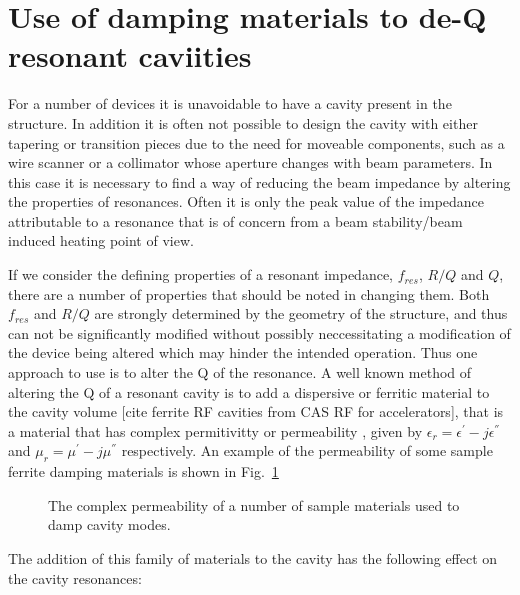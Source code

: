 \section{Use of damping materials to de-Q resonant caviities}
\label{sec:damping_materials}

For a number of devices it is unavoidable to have a cavity present in the structure. In addition it is often not possible to design the cavity with either tapering or transition pieces due to the need for moveable components, such as a wire scanner or a collimator whose aperture changes with beam parameters. In this case it is necessary to find a way of reducing the beam impedance by altering the properties of resonances. Often it is only the peak value of the impedance attributable to a resonance that is of concern from a beam stability/beam induced heating point of view. 

If we consider the defining properties of a resonant impedance, $f_{res}$, $R/Q$ and $Q$, there are a number of properties that should be noted in changing them. Both $f_{res}$ and $R/Q$ are strongly determined by the geometry of the structure, and thus can not be significantly modified without possibly neccessitating a modification of the device being altered which may hinder the intended operation. Thus one approach to use is to alter the Q of the resonance. A well known method of altering the Q of a resonant cavity is to add a dispersive or ferritic material to the cavity volume [cite ferrite RF cavities from CAS RF for accelerators], that is a material that has complex permitivitty or permeability , given by $\epsilon_{r} = \epsilon^{'} - j \epsilon^{''}$ and $\mu_{r} = \mu^{'} - j \mu^{''}$ respectively. An example of the permeability of some sample ferrite damping materials is shown in Fig.~\ref{fig:ferr_mu_damp}

\begin{figure}

\label{fig:ferr_mu_damp}
\caption{The complex permeability of a number of sample materials used to damp cavity modes.}
\end{figure}

The addition of this family of materials to the cavity has the following effect on the cavity resonances:


